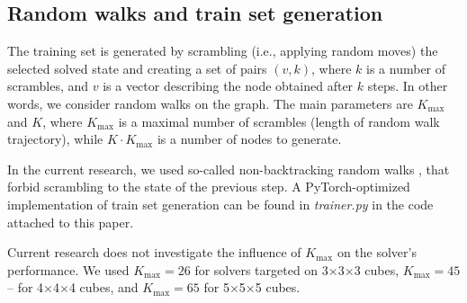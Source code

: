 
\subsection{\label{sec_rw_ts}Random walks and train set generation}

The training set is generated by scrambling (i.e., applying random moves) the selected solved state and creating a set of pairs $(v,k)$, where $k$ is a number of scrambles, and  $v$ is a vector describing the node obtained after $k$ steps. In other words, we consider random walks on the graph. The main parameters are $K_{\text{max}}$ and $K$, where $K_{\text{max}}$ is a maximal number of scrambles (length of random walk trajectory), while $K\cdot K_{\text{max}}$ is a number of nodes to generate.

In the current research, we used so-called non-backtracking random walks \cite{alon2007non}, that forbid scrambling to the state of the previous step. A PyTorch-optimized implementation of train set generation can be found in \textit{trainer.py} in the code attached to this paper.

Current research does not investigate the influence of $K_{\text{max}}$ on the solver's performance. We used $K_{\text{max}}=26$ for solvers targeted on 3$\times$3$\times$3 cubes, $K_{\text{max}}=45$ -- for 4$\times$4$\times$4 cubes, and $K_{\text{max}}=65$ for 5$\times$5$\times$5 cubes.
